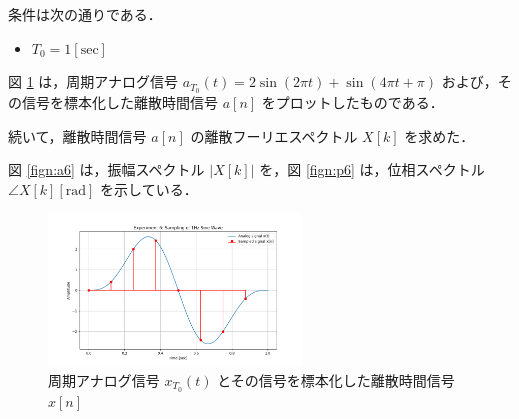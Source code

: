 \documentclass[fleqn, a4paper. 12pt]{jsarticle}
\begin{document}
  条件は次の通りである．

  \begin{itemize}
    \item $T_0 = 1 [\mathrm{sec}]$
  \end{itemize}

  図 \ref{fig:s6} は，周期アナログ信号 $a_{T_0}(t)=2 \sin (2 \pi t)+\sin (4 \pi t+\pi)$ および，その信号を標本化した離散時間信号 $a[n]$ をプロットしたものである．

  続いて，離散時間信号 $a[n]$ の離散フーリエスペクトル $X[k]$ を求めた．

  図 \ref{fign:a6} は，振幅スペクトル $|X[k]|$ を，図 \ref{fign:p6} は，位相スペクトル $\angle X[k][\mathrm{rad}]$ を示している．

  \begin{figure}[!h]
    \centering
    \includegraphics[width=0.6\textwidth]{sampling_experiment_6.png}
    \caption{周期アナログ信号 $x_{T_0}(t)$ とその信号を標本化した離散時間信号 $x[n]$}
    \label{fig:s6}
  \end{figure}
\end{document}
